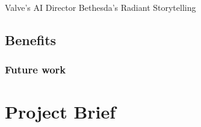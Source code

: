 \documentclass{./acm_proc_article-sp}
\begin{document}
Valve's AI Director
Bethesda's Radiant Storytelling

\subsection{Benefits}
\subsubsection{Future work}





\appendix
\section{Project Brief}
\balancecolumns
\end{document}
